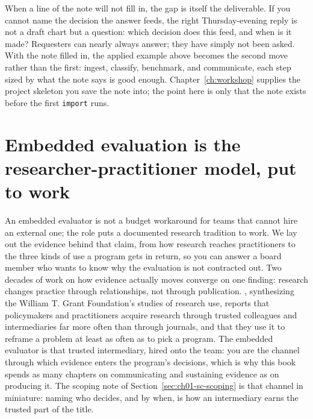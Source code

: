 \documentclass[
    a4paper,
    fontsize=10pt,
    twoside=true,
    numbers=noenddot,
]{kaobook}
\begin{document}
When a line of the note will not fill in, the gap is itself the deliverable. If you cannot name the decision the answer feeds, the right Thursday-evening reply is not a draft chart but a question: which decision does this feed, and when is it made? Requesters can nearly always answer; they have simply not been asked. With the note filled in, the applied example above becomes the second move rather than the first: ingest, classify, benchmark, and communicate, each step sized by what the note says is good enough. Chapter~\ref{ch:workshop} supplies the project skeleton you save the note into; the point here is only that the note exists before the first \texttt{import} runs.

\section{Embedded evaluation is the researcher-practitioner model, put to work}\label{sec:ch01-rpp}
An embedded evaluator is not a budget workaround for teams that cannot hire an external one; the role puts a documented research tradition to work. We lay out the evidence behind that claim, from how research reaches practitioners to the three kinds of use a program gets in return, so you can answer a board member who wants to know why the evaluation is not contracted out. Two decades of work on how evidence actually moves converge on one finding: research changes practice through relationships, not through publication. \textcite{tseng2012uses}, synthesizing the William T. Grant Foundation's studies of research use, reports that policymakers and practitioners acquire research through trusted colleagues and intermediaries far more often than through journals, and that they use it to reframe a problem at least as often as to pick a program. The embedded evaluator is that trusted intermediary, hired onto the team: you are the channel through which evidence enters the program's decisions, which is why this book spends as many chapters on communicating and sustaining evidence as on producing it. The scoping note of Section~\ref{sec:ch01-sc-scoping} is that channel in miniature: naming who decides, and by when, is how an intermediary earns the trusted part of the title.
\end{document}
